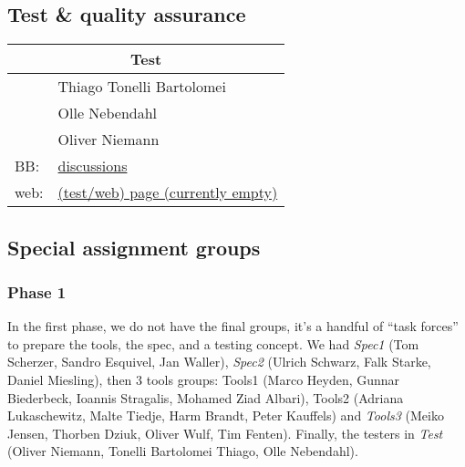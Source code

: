 \subsection*{Test \& quality assurance}
\label{sec:group.test}

\begin{tabular}{|l|p{8cm}|}
  \hline
  \multicolumn{2}{|c|}{Test}
  \\\hline\hline
   & 
   Thiago Tonelli Bartolomei
   \\
   &Olle Nebendahl
   \\
   &
   Oliver Niemann
  \\\hline
  BB: & \href{http://snert.informatik.uni-kiel.de:8080/~swprakt/phpBB2/viewforum.php?f=9}{discussions}
  \\
  web: & \href{http://snert.informatik.uni-kiel.de:8080/~wprguest4}{(test/web) page (currently empty)}
\end{tabular}





\subsection*{Special assignment groups}
\label{sec:groups.special}



\subsubsection*{Phase 1}

In the first phase, we do not have the final groups, it's a handful of
``task forces'' to prepare the tools, the spec, and a testing concept.  We
had \textsl{Spec1} (Tom Scherzer, Sandro Esquivel, Jan Waller),
\textsl{Spec2} (Ulrich Schwarz, Falk Starke, Daniel Miesling), then 3 tools
groups: Tools1 (Marco Heyden, Gunnar Biederbeck, Ioannis Stragalis, Mohamed
Ziad Albari), Tools2 (Adriana Lukaschewitz, Malte Tiedje, Harm Brandt,
Peter Kauffels) and \textsl{Tools3} (Meiko Jensen, Thorben Dziuk, Oliver
Wulf, Tim Fenten). Finally, the testers in \textsl{Test} (Oliver Niemann,
Tonelli Bartolomei Thiago, Olle Nebendahl).


\iffalse



